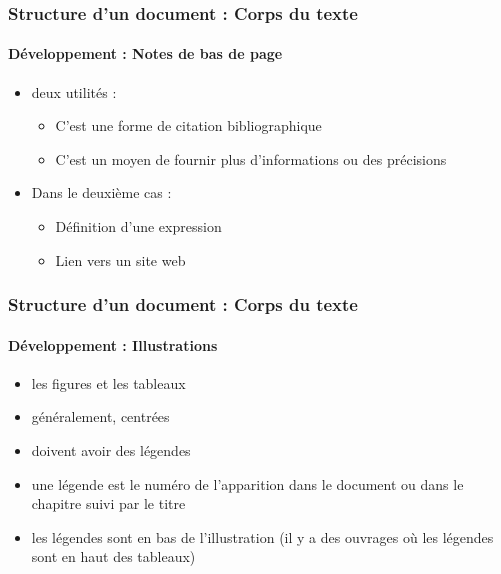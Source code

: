 \documentclass[xcolor=table]{beamer}
\begin{document}
\begin{frame}
\frametitle{Structure d'un document : Corps du texte}
\framesubtitle{Développement : Notes de bas de page}

\begin{minipage}{0.60\textwidth}
	\begin{itemize}
		\item deux utilités :
		
		\begin{itemize}
			\item C'est une forme de citation bibliographique
			\item C'est un moyen de fournir plus d'informations ou des précisions
		\end{itemize}
	
		\item Dans le deuxième cas : 
		
		\begin{itemize}
			\item Définition d'une expression
			\item Lien vers un site web
		\end{itemize}
	\end{itemize}
\end{minipage}
\begin{minipage}{0.38\textwidth}
\end{minipage}

\end{frame}

\begin{frame}
\frametitle{Structure d'un document : Corps du texte}
\framesubtitle{Développement : Illustrations}

\begin{minipage}{0.60\textwidth}
	\begin{itemize}
		\item les figures et les tableaux
		\item généralement, centrées 
		\item doivent avoir des légendes 
		\item une légende est le numéro de l'apparition dans le document ou dans le chapitre suivi par le titre
		\item les légendes sont en bas de l'illustration (il y a des ouvrages où les légendes sont en haut des tableaux)
		
	\end{itemize}
\end{minipage}
\begin{minipage}{0.38\textwidth}
\end{minipage}

\end{frame}
\end{document}
